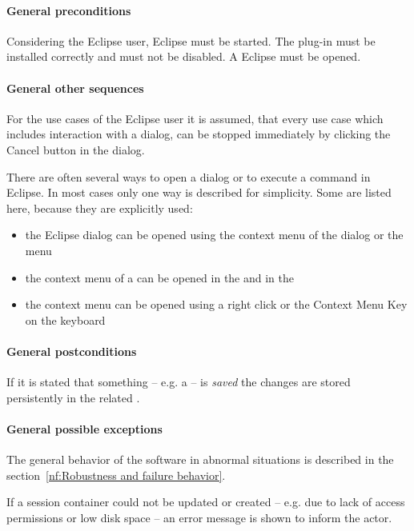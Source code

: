 \paragraph{General preconditions} \label{fr:General preconditions}
Considering the Eclipse user, Eclipse must be started. The plug-in must be installed correctly and must not be disabled. A Eclipse  must be opened.

\paragraph{General other sequences}
For the use cases of the Eclipse user it is assumed, that every use case which includes interaction with a dialog, can be stopped immediately by clicking the Cancel button in the dialog.
\par
There are often several ways to open a dialog or to execute a command in Eclipse. In most cases only one way is described for simplicity. Some are listed here, because they are explicitly used:
\begin{itemize}
  \item the Eclipse dialog  can be opened using the context menu of the dialog or the menu 
  \item the context menu of a  can be opened in the  and in the 
  \item the context menu can be opened using a right click or the Context Menu Key on the keyboard
\end{itemize}

\paragraph{General postconditions}
If it is stated that something -- e.g. a  -- is \textit{saved} the changes are stored persistently in the related .

\paragraph{General possible exceptions}
The general behavior of the software in abnormal situations is described in the section~\ref{nf:Robustness and failure behavior}.
\par
If a session container could not be updated or created -- e.g. due to lack of access permissions or low disk space -- an error message is shown to inform the actor.

